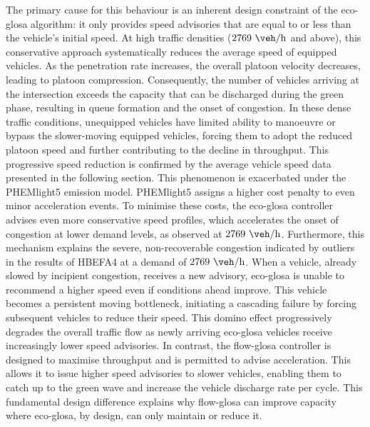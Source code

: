 The primary cause for this behaviour is an inherent design constraint of the \ac{eco-glosa} algorithm: it only provides speed advisories that are equal to or less than the vehicle's initial speed. At high traffic densities ($2769~\unit{\veh\per\hour}$ and above), this conservative approach systematically reduces the average speed of equipped vehicles. As the penetration rate increases, the overall platoon velocity decreases, leading to platoon compression. Consequently, the number of vehicles arriving at the intersection exceeds the capacity that can be discharged during the green phase, resulting in queue formation and the onset of congestion. In these dense traffic conditions, unequipped vehicles have limited ability to manoeuvre or bypass the slower-moving equipped vehicles, forcing them to adopt the reduced platoon speed and further contributing to the decline in throughput. This progressive speed reduction is confirmed by the average vehicle speed data presented in the following section.
\mynewline
This phenomenon is exacerbated under the PHEMlight5 emission model. PHEMlight5 assigns a higher cost penalty to even minor acceleration events. To minimise these costs, the \ac{eco-glosa} controller advises even more conservative speed profiles, which accelerates the onset of congestion at lower demand levels, as observed at $2769~\unit{\veh\per\hour}$.
Furthermore, this mechanism explains the severe, non-recoverable congestion indicated by outliers in the results of HBEFA4 at a demand of $2769~\unit{\veh\per\hour}$. When a vehicle, already slowed by incipient congestion, receives a new advisory, \ac{eco-glosa} is unable to recommend a higher speed even if conditions ahead improve. This vehicle becomes a persistent moving bottleneck, initiating a cascading failure by forcing subsequent vehicles to reduce their speed. This domino effect progressively degrades the overall traffic flow as newly arriving \ac{eco-glosa} vehicles receive increasingly lower speed advisories.
\mynewline
In contrast, the \ac{flow-glosa} controller is designed to maximise throughput and is permitted to advise acceleration. This allows it to issue higher speed advisories to slower vehicles, enabling them to catch up to the green wave and increase the vehicle discharge rate per cycle. This fundamental design difference explains why \ac{flow-glosa} can improve capacity where \ac{eco-glosa}, by design, can only maintain or reduce it.

